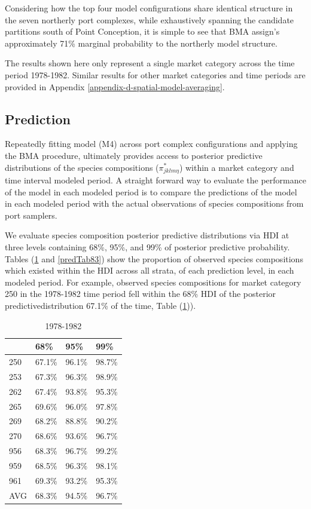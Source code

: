 \documentclass[12pt]{article}
\begin{document}
Considering how the top four model configurations share identical
structure in the seven northerly port complexes, while exhaustively
spanning the candidate partitions south of Point Conception, it is
simple to see that BMA assign's approximately 71\% marginal probability
to the northerly model structure.

The results shown here only represent a single market category across
the time period 1978-1982. Similar results for other market categories
and time periods are provided in Appendix \ref{appendix-d-spatial-model-averaging}.

\subsection{Prediction}\label{prediction}

Repeatedly fitting model (M4) across port complex configurations and
applying the BMA procedure, ultimately provides access to posterior
predictive distributions of the species compositions
(\(\pi^*_{jklm\eta}\)) within a market category and time interval
modeled period. A straight forward way to evaluate the performance of
the model in each modeled period is to compare the predictions of the
model in each modeled period with the actual observations of species
compositions from port samplers.

We evaluate species composition posterior predictive distributions via
HDI at three levels containing 68\%, 95\%, and 99\% of posterior
predictive probability. Tables (\ref{predTab78} and \ref{predTab83}) 
show the proportion of observed species compositions which existed within the 
HDI across all strata, of each prediction level, in each modeled period. For 
example, observed species compositions for market category 250 in the 
1978-1982 time period fell within the 68\% HDI of the posterior 
predictivedistribution 67.1\% of the time, Table (\ref{predTab78})).

\begin{table}[h!]
\centering
\begin{tabular}[c]{@{}llll@{}}
\hline
& 68\% & 95\% & 99\% \\ \hline
250 & 67.1\% & 96.1\% & 98.7\% \\
253 & 67.3\% & 96.3\% & 98.9\% \\ 
262 & 67.4\% & 93.8\% & 95.3\% \\
265 & 69.6\% & 96.0\% & 97.8\% \\
269 & 68.2\% & 88.8\% & 90.2\% \\
270 & 68.6\% & 93.6\% & 96.7\% \\
956 & 68.3\% & 96.7\% & 99.2\% \\
959 & 68.5\% & 96.3\% & 98.1\% \\
961 & 69.3\% & 93.2\% & 95.3\% \\
AVG & 68.3\% & 94.5\% & 96.7\% \\ \hline
\end{tabular}
\caption{1978-1982}
\label{predTab78}
\end{table}
\end{document}
